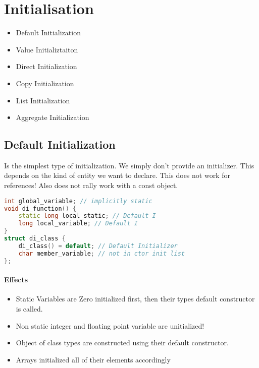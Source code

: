 
\section{Initialisation}

\begin{itemize}
	\itemsep -0.5em
	\item Default Initialization
	\item Value Initializtaiton
	\item Direct Initialization
	\item Copy Initialization
	\item List Initialization
	\item Aggregate Initialization
\end{itemize}

\subsection{Default Initialization}
Is the simplest type of initialization. We simply don't provide an initializer. This depends on the kind of entity we want to declare. This does not work for references! Also does not rally work with a const object. 

\begin{lstlisting}[language=C++]
int global_variable; // implicitly static
void di_function() {
	static long local_static; // Default I 
	long local_variable; // Default I
}
struct di_class {
	di_class() = default; // Default Initializer
	char member_variable; // not in ctor init list 
};
\end{lstlisting}

\paragraph{Effects}
\begin{itemize}
  \itemsep -0.5em 
  \item Static Variables are Zero initialized first, then their types default constructor is called.
  \item Non static integer and floating point variable are unitialized!
  \item Object of class types are constructed using their default constructor.
  \item Arrays initialized all of their elements accordingly
\end{itemize}

